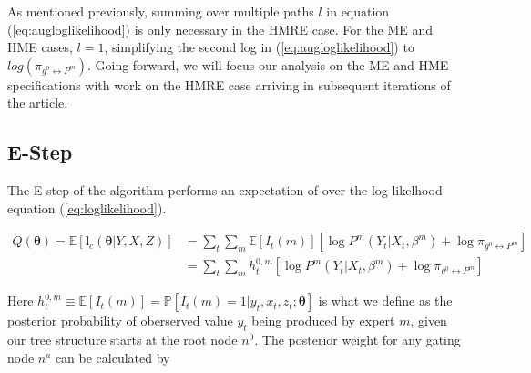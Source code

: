 \documentclass[12pt]{article}
\newcommand{\gateprod}[2]{\pi_{#1 \longleftrightarrow #2}}
\begin{document}
As mentioned previously, summing over multiple paths $l$ in equation
(\ref{eq:augloglikelihood}) is only necessary in the HMRE case. For the ME
and HME cases, $l = 1$, simplifying the second log in (\ref{eq:augloglikelihood})
to $log(\gateprod{g^{0}}{P^{m}})$. Going forward, we will focus our analysis on
the ME and HME specifications with work on the HMRE case arriving in subsequent
iterations of the article.




\subsection{E-Step}
The E-step of the algorithm performs an expectation of over the log-likelhood
equation (\ref{eq:loglikelihood}).

\begin{equation} \label{eq:Estep}
  \begin{split}
  Q(\boldsymbol{\theta}) = \mathbb{E} \left [ \boldsymbol{l}_{c}(\boldsymbol{\theta}|Y,X,Z) \right] & = \sum_{t}\sum_{m} \mathbb{E} \left[ I_{t}(m) \right] \left[ \log P^{m}(Y_{t}|X_{t}, \beta^{m}) + \log \gateprod{g^{0}}{P^{m}} \right] \\ 
   & = \sum_{t} \sum_{m} h^{0,m}_{t} \left[ \log P^{m}(Y_{t}|X_{t},\beta^{m}) + \log \gateprod{g^{0}}{P^{m}} \right]
 \end{split}
\end{equation}

Here $h^{0,m}_{t} \equiv \mathbb{E}\left[I_{t}(m)\right] = \mathbb{P}[I_{t}(m) = 1| y_{t}, x_{t}, z_{t}; \boldsymbol{\theta}]$
is what we define as the posterior probability of oberserved value $y_{t}$ being
produced by expert $m$, given our tree structure starts at the root node $n^{0}$.
The posterior weight for any gating node $n^{a}$ can be calculated by
\end{document}

